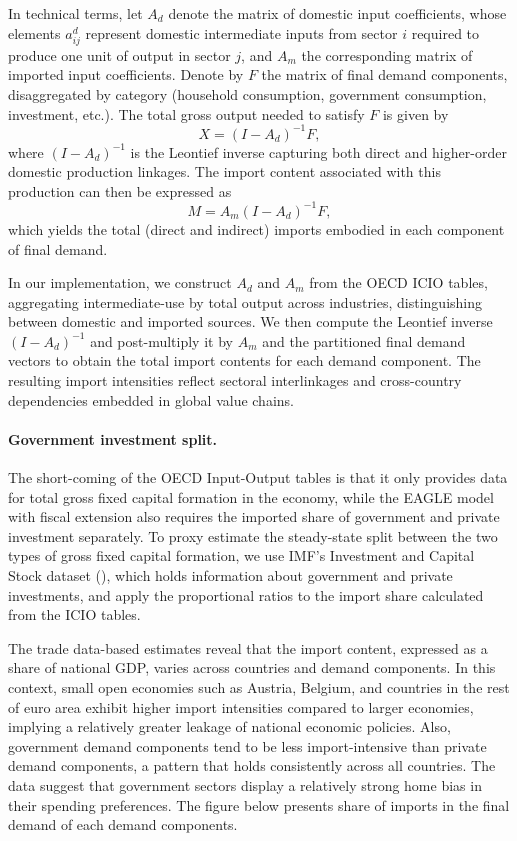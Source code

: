 \documentclass[a4paper,11pt]{article}
\numberwithin{equation}{section}
\begin{document}
In technical terms,  let $A_d$ denote the matrix of domestic input coefficients, whose elements $a_{ij}^d$ represent domestic intermediate inputs from sector $i$ required to produce one unit of output in sector $j$, and $A_m$ the corresponding matrix of imported input coefficients. Denote by $F$ the matrix of final demand components, disaggregated by category (household consumption, government consumption, investment, etc.). The total gross output needed to satisfy $F$ is given by
\[X = (I - A_d)^{-1} F,\]
where $(I - A_d)^{-1}$ is the Leontief inverse capturing both direct and higher-order domestic production linkages. The import content associated with this production can then be expressed as
\[M = A_m (I - A_d)^{-1} F,\]
which yields the total (direct and indirect) imports embodied in each component of final demand. 

In our implementation, we construct $A_d$ and $A_m$ from the OECD ICIO tables, aggregating intermediate-use by total output across industries, distinguishing between domestic and imported sources. We then compute the Leontief inverse $(I - A_d)^{-1}$ and post-multiply it by $A_m$ and the partitioned final demand vectors to obtain the total import contents for each demand component. The resulting import intensities reflect sectoral interlinkages and cross-country dependencies embedded in global value chains.

\paragraph{Government investment split.}
The short-coming of the OECD Input-Output tables is that it only provides data for total gross fixed capital formation in the economy, while the EAGLE model with fiscal extension also requires the imported share of government and private investment separately. To proxy estimate the steady-state split between the two types of gross fixed capital formation, we use IMF's Investment and Capital Stock dataset (\citet{FAS2025}), which holds information about government and private investments, and apply the proportional ratios to the import share calculated from the ICIO tables.

The trade data-based estimates reveal that the import content, expressed as a share of national GDP, varies across countries and demand components. In this context, small open economies such as Austria, Belgium, and countries in the rest of euro area exhibit higher import intensities compared to larger economies, implying a relatively greater leakage of national economic policies. Also, government demand components tend to be less import-intensive than private demand components, a pattern that holds consistently across all countries. The data suggest that government sectors display a relatively strong home bias in their spending preferences. The figure below presents share of imports in the final demand of each demand components. 
\end{document}
